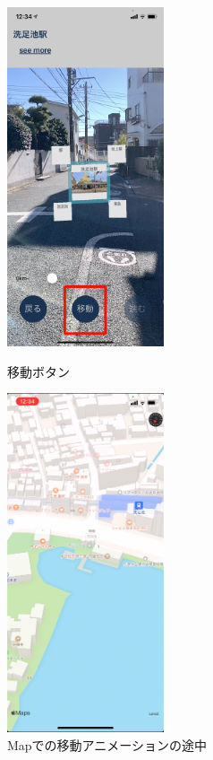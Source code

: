 \begin{figure}[H]
  \begin{minipage}{0.5\hsize}
    \centering
    \includegraphics[height=100mm]{images/hypar_touch_move_button.png}
    \caption{移動ボタン} \label{fig:hypar_touch_move_button}
  \end{minipage}
  \begin{minipage}{0.5\hsize}
    \centering
    \includegraphics[height=100mm]{images/hypar_touch_move_map.png}
    \caption{Mapでの移動アニメーションの途中} \label{fig:hypar_touch_move_map}
  \end{minipage}
\end{figure}

